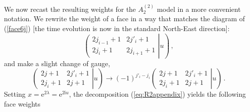 \documentclass[11pt]{article}
\begin{document}
We now recast the resulting weights for the $A_2^{(2)}$ model in a more convenient notation.
We rewrite the weight of a face in a way that matches the diagram of (\ref{face6j}) [the time evolution is now in the standard
North-East direction]:
%
\begin{equation}
  \left. \left( \begin{array}{cc} 2 j_{i-1}+1 & 2 j'_i +1 \\ 2 j_i +1  & 2 j_{i+1} +1 \end{array} \right| u  \right) \,,
 \end{equation}
%
and make a slight change of gauge, 
%
\begin{equation}
  \left. \left( \begin{array}{cc} 2 j +1 & 2 j'_i +1 \\ 2 j_i +1  & 2 j +1 \end{array} \right| u  \right)  \to (-1)^{j'_i - j_i} 
    \left. \left( \begin{array}{cc} 2 j +1 & 2 j'_i +1 \\ 2 j_i +1  & 2 j +1 \end{array} \right| u  \right) \,.
\end{equation}
%
Setting $x = \mathrm{e}^{2 \lambda} = \mathrm{e}^{2 \mathrm{i} u}$, the decomposition (\ref{eq:R2appendix}) yields the following face weights 
%
\end{document}
